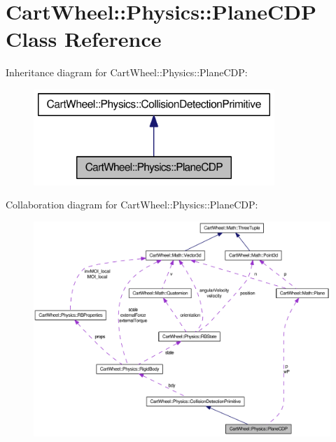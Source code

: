 \hypertarget{classCartWheel_1_1Physics_1_1PlaneCDP}{
\section{CartWheel::Physics::PlaneCDP Class Reference}
\label{classCartWheel_1_1Physics_1_1PlaneCDP}
}


Inheritance diagram for CartWheel::Physics::PlaneCDP:\nopagebreak
\begin{figure}[H]
\begin{center}
\leavevmode
\includegraphics[width=258pt]{classCartWheel_1_1Physics_1_1PlaneCDP__inherit__graph}
\end{center}
\end{figure}


Collaboration diagram for CartWheel::Physics::PlaneCDP:\nopagebreak
\begin{figure}[H]
\begin{center}
\leavevmode
\includegraphics[width=400pt]{classCartWheel_1_1Physics_1_1PlaneCDP__coll__graph}
\end{center}
\end{figure}
